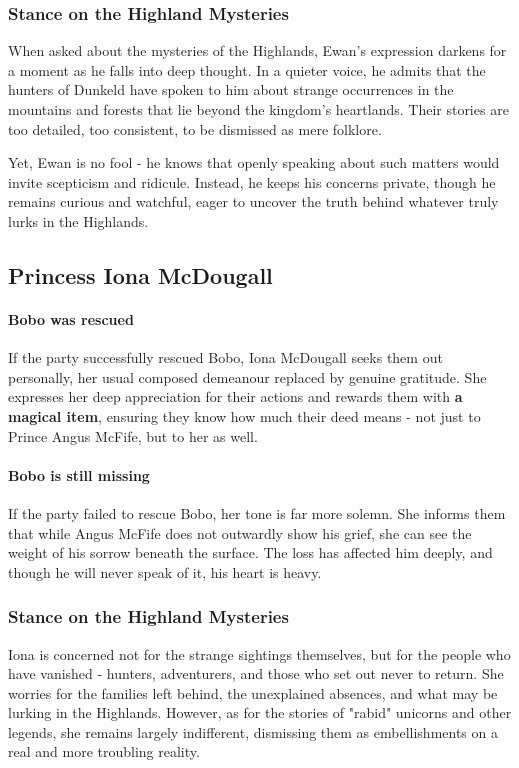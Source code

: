 \subsubsection*{Stance on the Highland Mysteries}
{\entryfont When asked about the mysteries of the Highlands, Ewan's expression darkens for a moment as he falls into deep thought. In a quieter voice, he admits that the hunters of Dunkeld have spoken to him about strange occurrences in the mountains and forests that lie beyond the kingdom's heartlands. Their stories are too detailed, too consistent, to be dismissed as mere folklore.

Yet, Ewan is no fool - he knows that openly speaking about such matters would invite scepticism and ridicule. Instead, he keeps his concerns private, though he remains curious and watchful, eager to uncover the truth behind whatever truly lurks in the Highlands.}
\subsection*{Princess Iona McDougall}
{\entryfont \paragraph*{Bobo was rescued} If the party successfully rescued Bobo, Iona McDougall seeks them out personally, her usual composed demeanour replaced by genuine gratitude. She expresses her deep appreciation for their actions and rewards them with \textbf{a magical item}, ensuring they know how much their deed means - not just to Prince Angus McFife, but to her as well.}
{\entryfont \paragraph*{Bobo is still missing}
If the party failed to rescue Bobo, her tone is far more solemn. She informs them that while Angus McFife does not outwardly show his grief, she can see the weight of his sorrow beneath the surface. The loss has affected him deeply, and though he will never speak of it, his heart is heavy.}
\subsubsection*{Stance on the Highland Mysteries}
{\entryfont Iona is concerned not for the strange sightings themselves, but for the people who have vanished - hunters, adventurers, and those who set out never to return. She worries for the families left behind, the unexplained absences, and what may be lurking in the Highlands. However, as for the stories of "rabid" unicorns and other legends, she remains largely indifferent, dismissing them as embellishments on a real and more troubling reality.}
